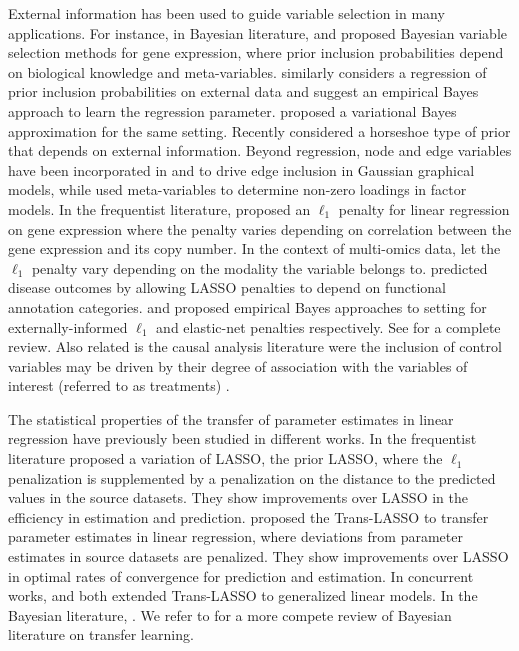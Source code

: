 \documentclass{article}
\begin{document}
External information has been used to guide variable selection in many applications. For instance, in Bayesian literature, \cite{stingo:2011} and \cite{cassese:2014} proposed Bayesian variable selection methods for gene expression, where prior inclusion probabilities depend on biological knowledge and meta-variables. \cite{vandeWiel2019} similarly considers a regression of prior inclusion probabilities on external data and suggest an empirical Bayes approach to learn the regression parameter. \cite{Velten2021} proposed a variational Bayes approximation for the same setting. Recently \cite{busatto2023} considered a horseshoe type of prior that depends on external information. Beyond regression, node and edge variables have been incorporated in \cite{peterson} and \cite{jewson2023graphical} to drive edge inclusion in Gaussian graphical models, while \cite{schiavon2022generalized} used meta-variables to determine non-zero loadings in factor models. In the frequentist literature, \citet{Bergersen2011} proposed an $\ell_1$ penalty for linear regression on gene expression where the penalty varies depending on correlation between the gene expression and its copy number. In the context of multi-omics data, \cite{Boulesteix2017} let the $\ell_1$ penalty vary depending on the modality the variable belongs to. \cite{chen_tinghuei:2021} predicted disease outcomes by allowing LASSO penalties to depend on functional annotation categories. \cite{Zeng2020} and \cite{vanNee2023} proposed empirical Bayes approaches to setting for externally-informed $\ell_1$ and elastic-net penalties respectively. See \cite{vandewiel2024} for a complete review. Also related is the causal analysis literature were the inclusion of control variables may be driven by their degree of association with the variables of interest (referred to as treatments) \citep{belloni2014inference,antonelli2021bayesian}. 

The statistical properties of the transfer of parameter estimates in linear regression have previously been studied in different works. In the frequentist literature \cite{Jiang2016} proposed a variation of LASSO, the prior LASSO, where the $\ell_1$ penalization is supplemented by a penalization on the distance to the predicted values in the source datasets. They show improvements over LASSO in the efficiency in estimation and prediction. \cite{Li2021} proposed the Trans-LASSO to transfer parameter estimates in linear regression, where deviations from parameter estimates in source datasets are penalized. They show improvements over LASSO in optimal rates of convergence for prediction and estimation. In concurrent works, \cite{Li2024} and \cite{Tian2023} both extended Trans-LASSO to generalized linear models. In the Bayesian literature,  . We refer to \cite{dunson} for a more compete review of Bayesian literature on transfer learning.
\end{document}
